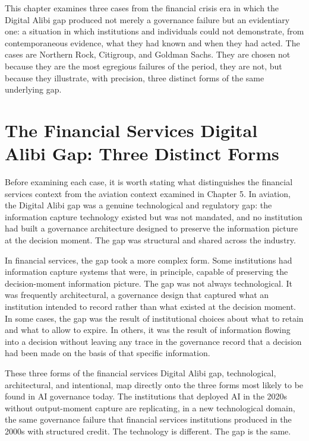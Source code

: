 This chapter examines three cases from the financial crisis era in which the Digital Alibi gap produced not merely a governance failure but an evidentiary one: a situation in which institutions and individuals could not demonstrate, from contemporaneous evidence, what they had known and when they had acted. The cases are Northern Rock, Citigroup, and Goldman Sachs. They are chosen not because they are the most egregious failures of the period, they are not, but because they illustrate, with precision, three distinct forms of the same underlying gap.

\scenebreak

\section{The Financial Services Digital Alibi Gap: Three Distinct Forms}

Before examining each case, it is worth stating what distinguishes the financial services context from the aviation context examined in Chapter 5. In aviation, the Digital Alibi gap was a genuine technological and regulatory gap: the information capture technology existed but was not mandated, and no institution had built a governance architecture designed to preserve the information picture at the decision moment. The gap was structural and shared across the industry.

In financial services, the gap took a more complex form. Some institutions had information capture systems that were, in principle, capable of preserving the decision-moment information picture. The gap was not always technological. It was frequently architectural, a governance design that captured what an institution intended to record rather than what existed at the decision moment. In some cases, the gap was the result of institutional choices about what to retain and what to allow to expire. In others, it was the result of information flowing into a decision without leaving any trace in the governance record that a decision had been made on the basis of that specific information.

These three forms of the financial services Digital Alibi gap, technological, architectural, and intentional, map directly onto the three forms most likely to be found in AI governance today. The institutions that deployed AI in the 2020s without output-moment capture are replicating, in a new technological domain, the same governance failure that financial services institutions produced in the 2000s with structured credit. The technology is different. The gap is the same.

